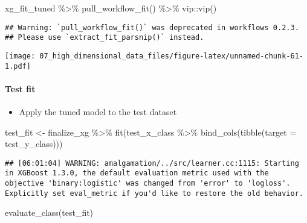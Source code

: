\documentclass[
]{book}
\newenvironment{Shaded}{\begin{snugshade}}{\end{snugshade}}
\newcommand{\AttributeTok}[1]{\textcolor[rgb]{0.77,0.63,0.00}{#1}}
\newcommand{\FunctionTok}[1]{\textcolor[rgb]{0.00,0.00,0.00}{#1}}
\newcommand{\NormalTok}[1]{#1}
\newcommand{\OtherTok}[1]{\textcolor[rgb]{0.56,0.35,0.01}{#1}}
\newcommand{\SpecialCharTok}[1]{\textcolor[rgb]{0.00,0.00,0.00}{#1}}
\providecommand{\tightlist}{%
  \setlength{\itemsep}{0pt}\setlength{\parskip}{0pt}}
\begin{document}
\begin{Shaded}
\begin{Highlighting}[]
\NormalTok{xg\_fit\_tuned }\SpecialCharTok{\%\textgreater{}\%}
  \FunctionTok{pull\_workflow\_fit}\NormalTok{() }\SpecialCharTok{\%\textgreater{}\%}
\NormalTok{  vip}\SpecialCharTok{::}\FunctionTok{vip}\NormalTok{()}
\end{Highlighting}
\end{Shaded}

\begin{verbatim}
## Warning: `pull_workflow_fit()` was deprecated in workflows 0.2.3.
## Please use `extract_fit_parsnip()` instead.
\end{verbatim}

\texttt{[image: 07\_high\_dimensional\_data\_files/figure-latex/unnamed-chunk-61-1.pdf]}

\hypertarget{test-fit-3}{%
\paragraph{Test fit}\label{test-fit-3}}

\begin{itemize}
\tightlist
\item
  Apply the tuned model to the test dataset
\end{itemize}

\begin{Shaded}
\begin{Highlighting}[]
\NormalTok{test\_fit }\OtherTok{\textless{}{-}}\NormalTok{ finalize\_xg }\SpecialCharTok{\%\textgreater{}\%}
  \FunctionTok{fit}\NormalTok{(test\_x\_class }\SpecialCharTok{\%\textgreater{}\%} \FunctionTok{bind\_cols}\NormalTok{(}\FunctionTok{tibble}\NormalTok{(}\AttributeTok{target =}\NormalTok{ test\_y\_class)))}
\end{Highlighting}
\end{Shaded}

\begin{verbatim}
## [06:01:04] WARNING: amalgamation/../src/learner.cc:1115: Starting in XGBoost 1.3.0, the default evaluation metric used with the objective 'binary:logistic' was changed from 'error' to 'logloss'. Explicitly set eval_metric if you'd like to restore the old behavior.
\end{verbatim}

\begin{Shaded}
\begin{Highlighting}[]
\FunctionTok{evaluate\_class}\NormalTok{(test\_fit)}
\end{Highlighting}
\end{Shaded}
\end{document}

